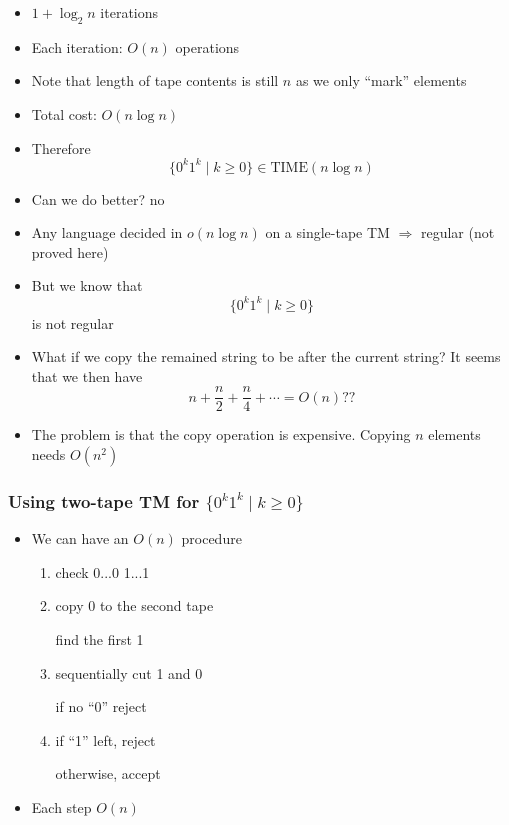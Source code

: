 \begin{frame}[allowframebreaks]
\begin{itemize}
\item [] $1+\log_2 n$ iterations

\item Each iteration: $O(n)$ operations
\item [] Note that length of tape contents is still $n$ as we only ``mark'' elements
\item Total cost: $O(n \log n)$

\item Therefore
  \begin{equation*}
\{0^k 1^k\mid k \geq 0\} \in \text{TIME}(n \log n)
\end{equation*}
\item Can we do better? no

\item Any language decided in $o(n\log n)$
on a single-tape TM $\Rightarrow$ regular
(not proved here)
\item But we know that
  \begin{equation*}
  \{0^k1^k \mid k \geq 0\}
\end{equation*}
is not regular
\item What if we copy the remained string to be after the current string?
  It seems that we then have
  \begin{equation*}
    n + \frac{n}{2} + \frac{n}{4} + \cdots = O(n)??
  \end{equation*}
\item The problem is that \alert{the copy operation is expensive}.
  Copying $n$ elements needs $O(n^2)$
  
\end{itemize}\end{frame} \begin{frame}[allowframebreaks] \frametitle{Using two-tape TM for $ \{0^k1^k \mid k \geq 0\}$}
  \begin{itemize}
\item We can have an $O(n)$ procedure
  \begin{enumerate}
  \item check 0...0 1...1

  \item copy 0 to the second tape

find the first 1
\item sequentially cut 1 and 0

if no ``0'' reject
\item if ``1'' left, reject

otherwise, accept
  \end{enumerate}

\item Each step $O(n)$

\end{itemize}\end{frame} 


